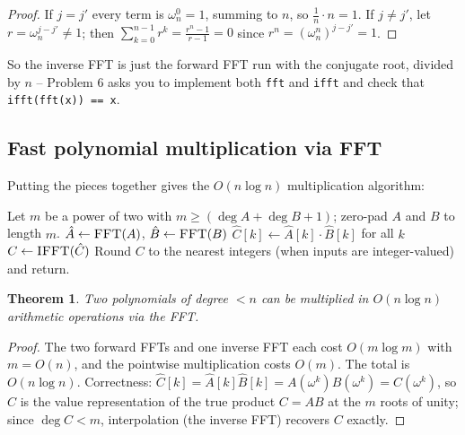 \documentclass[11pt]{article}
\newtheorem{theorem}{Theorem}[section]
\begin{document}
\begin{proof}
If $j = j'$ every term is $\omega_n^0 = 1$, summing to $n$, so $\frac1n \cdot n = 1$. If
$j \ne j'$, let $r = \omega_n^{j - j'} \ne 1$; then $\sum_{k=0}^{n-1} r^k = \frac{r^n - 1}{r - 1}
= 0$ since $r^n = (\omega_n^n)^{j-j'} = 1$.
\end{proof}

So the inverse FFT is just the forward FFT run with the conjugate root, divided by $n$ --
Problem 6 asks you to implement both \texttt{fft} and \texttt{ifft} and check that
\texttt{ifft(fft(x)) == x}.

\subsection{Fast polynomial multiplication via FFT}

Putting the pieces together gives the $O(n \log n)$ multiplication algorithm:

\begin{algorithm}[h]
\caption{Polynomial Multiplication via FFT}
\begin{algorithmic}[1]
\State Let $m$ be a power of two with $m \ge (\deg A + \deg B + 1)$; zero-pad $A$ and $B$ to length $m$.
\State $\hat A \gets \textsc{FFT}(A)$, \quad $\hat B \gets \textsc{FFT}(B)$ 
\State $\hat C[k] \gets \hat A[k] \cdot \hat B[k]$ for all $k$ 
\State $C \gets \textsc{IFFT}(\hat C)$ 
\State Round $C$ to the nearest integers (when inputs are integer-valued) and return.
\end{algorithmic}
\end{algorithm}

\begin{theorem}
Two polynomials of degree $< n$ can be multiplied in $O(n \log n)$ arithmetic operations via
the FFT.
\end{theorem}

\begin{proof}
The two forward FFTs and one inverse FFT each cost $O(m \log m)$ with $m = O(n)$, and the
pointwise multiplication costs $O(m)$. The total is $O(n \log n)$. Correctness: $\hat C[k] =
\hat A[k] \hat B[k] = A(\omega^k) B(\omega^k) = C(\omega^k)$, so $\hat C$ is the value
representation of the true product $C = AB$ at the $m$ roots of unity; since $\deg C < m$,
interpolation (the inverse FFT) recovers $C$ exactly.
\end{proof}
\end{document}
